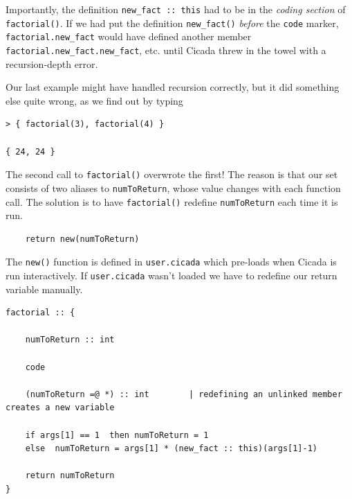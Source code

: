 \documentclass{article}
\newenvironment{code}{
       \begin{list}{}{
               \setlength{\leftmargin}{.4in}
               \setlength{\rightmargin}{0in}
               \setlength{\topsep}{.2in}
       }
       \small
       \item[] }
       { \end{list}   }
\begin{document}
\noindent Importantly, the definition \verb#new_fact :: this# had to be in the \emph{coding section} of \verb#factorial()#.  If we had put the definition \verb#new_fact()# \emph{before} the \verb#code# marker, \verb#factorial.new_fact# would have defined another member \verb#factorial.new_fact.new_fact#, etc. until Cicada threw in the towel with a recursion-depth error.

Our last example might have handled recursion correctly, but it did something else quite wrong, as we find out by typing

\begin{code} \begin{verbatim}
> { factorial(3), factorial(4) }

{ 24, 24 }
\end{verbatim} \end{code}

\noindent The second call to \verb#factorial()# overwrote the first!  The reason is that our set consists of two aliases to \verb#numToReturn#, whose value changes with each function call.  The solution is to have \verb#factorial()# redefine \verb#numToReturn# each time it is run.

\begin{code} \begin{verbatim}
    return new(numToReturn)
\end{verbatim} \end{code}

\noindent The \verb#new()# function is defined in \verb#user.cicada# which pre-loads when Cicada is run interactively.  If \verb#user.cicada# wasn't loaded we have to redefine our return variable manually.

\begin{code} \begin{verbatim}
factorial :: {
    
    numToReturn :: int
    
    code
    
    (numToReturn =@ *) :: int        | redefining an unlinked member creates a new variable
    
    if args[1] == 1  then numToReturn = 1
    else  numToReturn = args[1] * (new_fact :: this)(args[1]-1)
    
    return numToReturn
}
\end{verbatim} \end{code}
\end{document}

